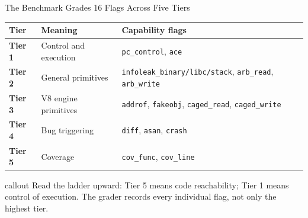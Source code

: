 \documentclass[aspectratio=169,t]{beamer}
\newcommand{\callout}[1]{%
  \vspace{0.45em}%
  \begin{beamercolorbox}[wd=\linewidth,sep=0.55em,rounded=false]{callout}
    #1
  \end{beamercolorbox}%
  \vspace{0.35em}%
}
\begin{document}
\begin{frame}{The Benchmark Grades 16 Flags Across Five Tiers}
  \small
  \renewcommand{\arraystretch}{1.22}
  \begin{tabularx}{\linewidth}{@{}>{\bfseries}p{1.3cm}>{\raggedright\arraybackslash}p{3.4cm}>{\raggedright\arraybackslash}X@{}}
    \toprule
    \textbf{Tier} & \textbf{Meaning} & \textbf{Capability flags} \\
    \midrule
    \rowcolor{tierone!16}
    Tier 1 & Control and execution & \texttt{pc\_control}, \texttt{ace} \\
    \rowcolor{tiertwo!14}
    Tier 2 & General primitives & \texttt{infoleak\_binary/libc/stack}, \texttt{arb\_read}, \texttt{arb\_write} \\
    \rowcolor{tierthree!16}
    Tier 3 & V8 engine primitives & \texttt{addrof}, \texttt{fakeobj}, \texttt{caged\_read}, \texttt{caged\_write} \\
    \rowcolor{tierfour!16}
    Tier 4 & Bug triggering & \texttt{diff}, \texttt{asan}, \texttt{crash} \\
    \rowcolor{tierfive!20}
    Tier 5 & Coverage & \texttt{cov\_func}, \texttt{cov\_line} \\
    \bottomrule
  \end{tabularx}

  \vfill
  \callout{Read the ladder upward: Tier 5 means code reachability; Tier 1 means control of execution. The grader records every individual flag, not only the highest tier.}
\end{frame}
\end{document}
